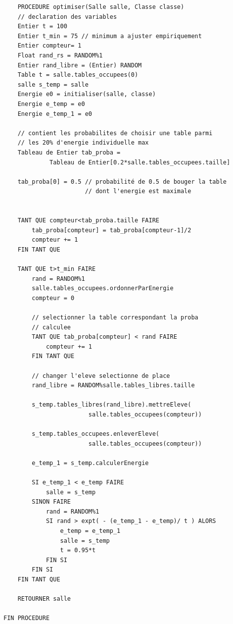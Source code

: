 \documentclass[11pt,a4paper, openany]{book}
\begin{document}
\begin{verbatim}
    PROCEDURE optimiser(Salle salle, Classe classe)
    // declaration des variables
    Entier t = 100
    Entier t_min = 75 // minimum a ajuster empiriquement
    Entier compteur= 1
    Float rand_rs = RANDOM%1
    Entier rand_libre = (Entier) RANDOM
    Table t = salle.tables_occupees(0)
    salle s_temp = salle
    Energie e0 = initialiser(salle, classe)
    Energie e_temp = e0
    Energie e_temp_1 = e0
    
    // contient les probabilites de choisir une table parmi
    // les 20% d'energie individuelle max
    Tableau de Entier tab_proba = 
             Tableau de Entier[0.2*salle.tables_occupees.taille]
    
    tab_proba[0] = 0.5 // probabilité de 0.5 de bouger la table
                       // dont l'energie est maximale
    
    
    TANT QUE compteur<tab_proba.taille FAIRE
        tab_proba[compteur] = tab_proba[compteur-1]/2
        compteur += 1
    FIN TANT QUE
    
    TANT QUE t>t_min FAIRE
        rand = RANDOM%1
        salle.tables_occupees.ordonnerParEnergie
        compteur = 0
        
        // selectionner la table correspondant la proba
        // calculee
        TANT QUE tab_proba[compteur] < rand FAIRE
            compteur += 1
        FIN TANT QUE
        
        // changer l'eleve selectionne de place
        rand_libre = RANDOM%salle.tables_libres.taille
        
        s_temp.tables_libres(rand_libre).mettreEleve(
                        salle.tables_occupees(compteur))
                        
        s_temp.tables_occupees.enleverEleve(
                        salle.tables_occupees(compteur))
        
        e_temp_1 = s_temp.calculerEnergie
        
        SI e_temp_1 < e_temp FAIRE
            salle = s_temp
        SINON FAIRE
            rand = RANDOM%1
            SI rand > expt( - (e_temp_1 - e_temp)/ t ) ALORS
                e_temp = e_temp_1
                salle = s_temp
                t = 0.95*t
            FIN SI
        FIN SI
    FIN TANT QUE
    
    RETOURNER salle
    
FIN PROCEDURE
            
        
        
        
    
\end{verbatim}
\end{document}
